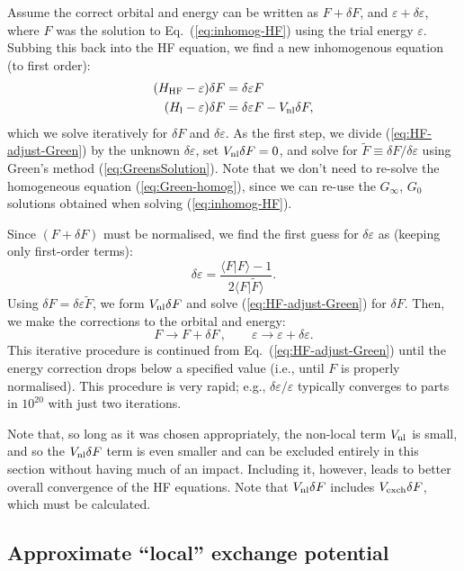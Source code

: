 \documentclass[10pt,twocolumn,a4paper]{article}%
\newcommand{\braket}[1]{\ensuremath{\langle #1\rangle}}	%
\newcommand{\be}{\begin{equation}}
\newcommand{\ee}{\end{equation}}
\def\en{\ensuremath{\varepsilon}}
\begin{document}
Assume the correct orbital and energy can be written as
$F +  \delta F$, and
$\en + \delta\en $,
where $F$ was the solution to Eq.~(\ref{eq:inhomog-HF}) using the trial energy $\en$.
Subbing this back into the HF equation, we find a new inhomogenous equation (to first order):
\begin{align}
(H_{\rm HF} - \en) \delta F &=  \delta\en F  \\
(H_{\rm l} - \en) \delta F &=  \delta\en F  - V_{\rm nl} \delta F,  \label{eq:HF-adjust-Green}
\end{align}
which we solve iteratively for $\delta F$ and $\delta \en$.
As the first step, we divide (\ref{eq:HF-adjust-Green}) by the unknown $\delta\en$, set $V_{\rm nl} \delta F=0$, and solve for $\tilde F\equiv\delta F/\delta\en$ using Green's method (\ref{eq:GreensSolution}).
Note that we don't need to re-solve the homogeneous equation (\ref{eq:Green-homog}), since we can re-use the $G_\infty$, $G_0$
solutions obtained when solving (\ref{eq:inhomog-HF}).

Since $(F+\delta F)$ must be normalised, we find the first guess for $\delta \en$ as (keeping only first-order terms):
\be
\delta \en = \frac{\braket{F|F} - 1}{2\braket{F|\tilde F}}.
\ee
Using  $\delta F = \delta\en\tilde F$, we form $V_{\rm nl} \delta F$ and solve (\ref{eq:HF-adjust-Green}) for $\delta F$.
Then, we make the corrections to the orbital and energy:
\be
F\to F+\delta F \, , \qquad \en\to\en + \delta\en.
\ee
This iterative procedure is continued from Eq.~(\ref{eq:HF-adjust-Green}) until the energy correction drops below a specified value
(i.e., until $F$ is properly normalised).
This procedure is very rapid; e.g., $\delta\en/\en$ typically converges to parts in $10^{20}$ with just two iterations.

Note that, so long as it was chosen appropriately, the non-local term $V_{\rm nl}$ is small, and so the $V_{\rm nl}\delta F$ term is even smaller and can be excluded entirely in this section without having much of an impact.
Including it, however, leads to better overall convergence of the HF equations.
Note that $V_{\rm nl} \delta F$ includes $V_{\rm exch} \delta F$, which must be calculated.




\subsection{Approximate ``local'' exchange potential}\label{sec:hf-approx}
\end{document}
